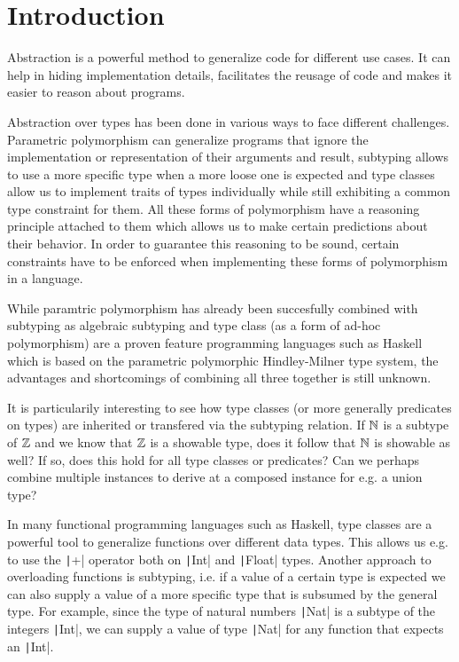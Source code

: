 
\chapter{Introduction}\label{ch:intro}

Abstraction is a powerful method to generalize code for different use cases.
It can help in hiding implementation details, facilitates the reusage of code and makes it easier to reason about programs.

Abstraction over types has been done in various ways to face different challenges.
Parametric polymorphism can generalize programs that ignore the implementation or representation of their arguments and result,
subtyping allows to use a more specific type when a more loose one is expected
and type classes allow us to implement traits of types individually while still exhibiting a common type constraint for them.
All these forms of polymorphism have a reasoning principle attached to them which allows us to make certain predictions about their behavior.
In order to guarantee this reasoning to be sound, certain constraints have to be enforced when implementing these forms of polymorphism in a language.

While paramtric polymorphism has already been succesfully combined with subtyping as algebraic subtyping \cite{dolan2017subtyping}
and type class (as a form of ad-hoc polymorphism) are a proven feature programming languages such as Haskell \cite{wadlerblott} which is based on the parametric polymorphic Hindley-Milner type system,
the advantages and shortcomings of combining all three together is still unknown.

It is particularily interesting to see how type classes (or more generally predicates on types) are inherited or transfered via the subtyping relation.
If $\mathbb{N}$ is a subtype of $\mathbb{Z}$ and we know that $\mathbb{Z}$ is a showable type, does it follow that $\mathbb{N}$ is showable as well?
If so, does this hold for all type classes or predicates?
Can we perhaps combine multiple instances to derive at a composed instance for e.g. a union type?

In many functional programming languages such as Haskell, type classes are a powerful tool to generalize functions over different data types.
This allows us e.g. to use the \texttt|+| operator both on \texttt|Int| and \texttt|Float| types.
Another approach to overloading functions is subtyping, i.e. if a value of a certain type is expected we can also supply a value of a more specific type that is subsumed by the general type.
For example, since the type of natural numbers \texttt|Nat| is a subtype of the integers \texttt|Int|, we can supply a value of type \texttt|Nat| for any function that expects an \texttt|Int|.

